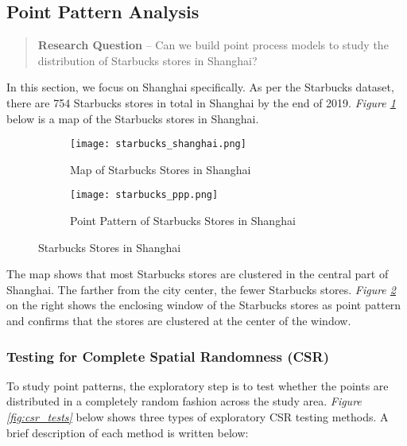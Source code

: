 \documentclass{article}
\begin{document}
\subsection{Point Pattern Analysis}

\begin{quote}
    \textbf{Research Question} -- Can we build point process models to study the distribution of Starbucks stores in Shanghai?
\end{quote}

In this section, we focus on Shanghai specifically. As per the Starbucks dataset, there are 754 Starbucks stores in total in Shanghai by the end of 2019. \textit{Figure \ref{fig:starbucks_shanghai_map}} below is a map of the Starbucks stores in Shanghai.

\begin{figure}[htbp]
    \begin{subfigure}[b]{0.48\textwidth}
        \centering
        \texttt{[image: starbucks\_shanghai.png]}
        \caption{Map of Starbucks Stores in Shanghai}
        \label{fig:starbucks_shanghai_map}
    \end{subfigure}
    \hfill
    \begin{subfigure}[b]{0.48\textwidth}
        \centering
        \texttt{[image: starbucks\_ppp.png]}
        \caption{Point Pattern of Starbucks Stores in Shanghai}
        \label{fig:starbucks_shanghai_window}
    \end{subfigure}
    \caption{Starbucks Stores in Shanghai}
    \label{fig:starbucks_shanghai}
\end{figure}

The map shows that most Starbucks stores are clustered in the central part of Shanghai. The farther from the city center, the fewer Starbucks stores. \textit{Figure \ref{fig:starbucks_shanghai_window}} on the right shows the enclosing window of the Starbucks stores as point pattern and confirms that the stores are clustered at the center of the window.

\subsubsection{Testing for Complete Spatial Randomness (CSR)}

To study point patterns, the exploratory step is to test whether the points are distributed in a completely random fashion across the study area. \textit{Figure \ref{fig:csr_tests}} below shows three types of exploratory CSR testing methods. A brief description of each method is written below:
\end{document}
